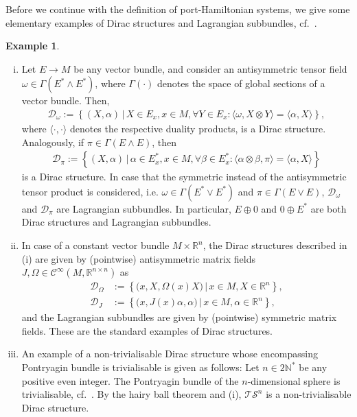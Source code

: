 \documentclass[preprint,12pt]{elsarticle}
\theoremstyle{definition}
\newtheorem{example}[theorem]{Example}
\newcommand{\set}[1]{\left\lbrace #1\right\rbrace}
\begin{document}
Before we continue with the definition of port-Hamiltonian systems, we give some elementary examples of Dirac structures and Lagrangian subbundles, cf.~\cite{Cour90}.

\begin{example}\label{ex:fun_Dirac_structures}
\begin{enumerate}[(i)]
\item Let $E\to M$ be any vector bundle, and consider an antisymmetric tensor field $\omega\in\Gamma(E^*\wedge E^*)$, where $\Gamma(\cdot)$ denotes the space of global sections of a vector bundle. Then,
\begin{align*}
\mathcal{D}_\omega := \set{(X,\alpha)\,\big\vert\,X\in E_x, x\in M, \forall Y\in E_x: \langle\omega,X\otimes Y\rangle = \langle\alpha,X\rangle},
\end{align*}
where $\langle\cdot,\cdot\rangle$ denotes the respective duality products, is a Dirac structure. Analogously, if $\pi\in\Gamma(E\wedge E)$, then
\begin{align*}
\mathcal{D}_\pi := \set{(X,\alpha)\,\big\vert\,\alpha\in E^*_x, x\in M, \forall \beta\in E^*_x: \langle\alpha\otimes \beta,\pi\rangle = \langle\alpha,X\rangle}
\end{align*}
is a Dirac structure. In case that the symmetric instead of the antisymmetric tensor product is considered, i.e. $\omega\in\Gamma(E^*\vee E^*)$ and $\pi\in\Gamma(E\vee E)$, $\mathcal{D}_\omega$ and $\mathcal{D}_\pi$ are Lagrangian subbundles. In particular, $E\oplus 0$ and $0\oplus E^*$ are both Dirac structures and Lagrangian subbundles.
\item In case of a constant vector bundle $M\times\mathbb{R}^n$, the Dirac structures described in (i) are given by (pointwise) antisymmetric matrix fields $J,\Omega\in\mathcal{C}^\infty(M,\mathbb{R}^{n\times n})$ as
\begin{align*}
\mathcal{D}_\Omega & := \set{\big(x,X,\Omega(x)X\big)\,\big\vert\,x\in M, X\in\mathbb{R}^n},\\
\mathcal{D}_J & := \set{\big(x,J(x)\alpha,\alpha\big)\,\big\vert\,x\in M, \alpha\in\mathbb{R}^n},
\end{align*}
and the Lagrangian subbundles are given by (pointwise) symmetric matrix fields. These are the standard examples of Dirac structures.
\item An example of a non-trivialisable Dirac structure whose encompassing Pontryagin bundle is trivialisable is given as follows: Let $n\in2\mathbb{N}^*$ be any positive even integer. The Pontryagin bundle of the $n$-dimensional sphere is trivialisable, cf.~\cite[Corollary 2.4]{EtayGoNiSant26}. By the hairy ball theorem and (i), $\mathcal{T}\mathcal{S}^n$ is a non-trivialisable Dirac structure.
\end{enumerate}
\end{example}
\end{document}
